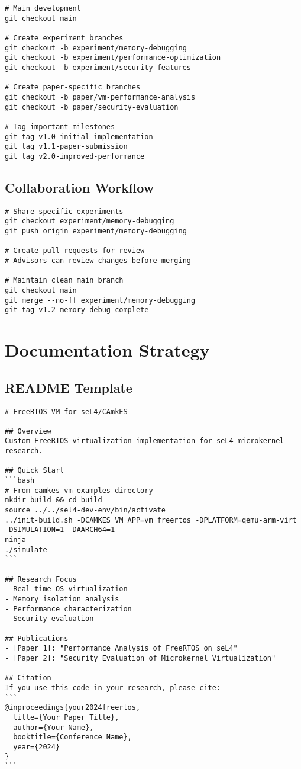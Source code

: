 \documentclass[11pt,a4paper]{article}
\begin{document}
\begin{lstlisting}[caption=Research Branching Workflow]
# Main development
git checkout main

# Create experiment branches
git checkout -b experiment/memory-debugging
git checkout -b experiment/performance-optimization
git checkout -b experiment/security-features

# Create paper-specific branches
git checkout -b paper/vm-performance-analysis
git checkout -b paper/security-evaluation

# Tag important milestones
git tag v1.0-initial-implementation
git tag v1.1-paper-submission
git tag v2.0-improved-performance
\end{lstlisting}

\subsection{Collaboration Workflow}

\begin{lstlisting}[caption=Collaboration with Advisors/Peers]
# Share specific experiments
git checkout experiment/memory-debugging
git push origin experiment/memory-debugging

# Create pull requests for review
# Advisors can review changes before merging

# Maintain clean main branch
git checkout main
git merge --no-ff experiment/memory-debugging
git tag v1.2-memory-debug-complete
\end{lstlisting}

\section{Documentation Strategy}

\subsection{README Template}

\begin{lstlisting}[caption=README.md Template]
# FreeRTOS VM for seL4/CAmkES

## Overview
Custom FreeRTOS virtualization implementation for seL4 microkernel research.

## Quick Start
```bash
# From camkes-vm-examples directory
mkdir build && cd build
source ../../sel4-dev-env/bin/activate
../init-build.sh -DCAMKES_VM_APP=vm_freertos -DPLATFORM=qemu-arm-virt -DSIMULATION=1 -DAARCH64=1
ninja
./simulate
```

## Research Focus
- Real-time OS virtualization
- Memory isolation analysis  
- Performance characterization
- Security evaluation

## Publications
- [Paper 1]: "Performance Analysis of FreeRTOS on seL4"
- [Paper 2]: "Security Evaluation of Microkernel Virtualization"

## Citation
If you use this code in your research, please cite:
```
@inproceedings{your2024freertos,
  title={Your Paper Title},
  author={Your Name},
  booktitle={Conference Name},
  year={2024}
}
```
\end{lstlisting}
\end{document}

